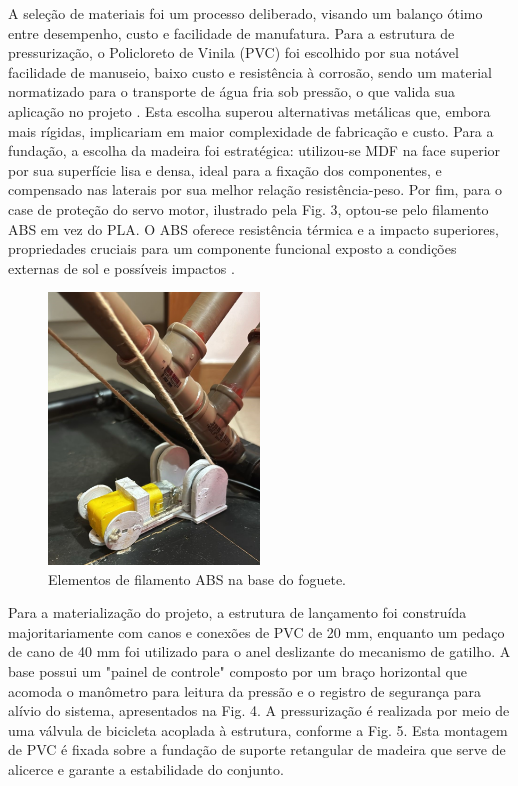 A seleção de materiais foi um processo deliberado, visando um balanço ótimo entre desempenho, custo e facilidade de manufatura. Para a estrutura de pressurização, o Policloreto de Vinila (PVC) foi escolhido por sua notável facilidade de manuseio, baixo custo e resistência à corrosão, sendo um material normatizado para o transporte de água fria sob pressão, o que valida sua aplicação no projeto \cite{tigre_soldavel}. Esta escolha superou alternativas metálicas que, embora mais rígidas, implicariam em maior complexidade de fabricação e custo. Para a fundação, a escolha da madeira foi estratégica: utilizou-se MDF na face superior por sua superfície lisa e densa, ideal para a fixação dos componentes, e compensado nas laterais por sua melhor relação resistência-peso. Por fim, para o case de proteção do servo motor, ilustrado pela Fig. 3, optou-se pelo filamento ABS em vez do PLA. O ABS oferece resistência térmica e a impacto superiores, propriedades cruciais para um componente funcional exposto a condições externas de sol e possíveis impactos \cite{ozsoy2021}.

\begin{figure}[H]
	\centering
	\includegraphics[width=0.5\textwidth,height=\textheight,keepaspectratio]{figuras/estruturas/base_foguete_perto.png}
	\caption{Elementos de filamento ABS na base do foguete.}
	\label{fig_base_foguete_lancamento}
\end{figure}

Para a materialização do projeto, a estrutura de lançamento foi construída majoritariamente com canos e conexões de PVC de 20 mm, enquanto um pedaço de cano de 40 mm foi utilizado para o anel deslizante do mecanismo de gatilho. A base possui um "painel de controle" composto por um braço horizontal que acomoda o manômetro para leitura da pressão e o registro de segurança para alívio do sistema, apresentados na Fig. 4. A pressurização é realizada por meio de uma válvula de bicicleta acoplada à estrutura, conforme a Fig. 5. Esta montagem de PVC é fixada sobre a fundação de suporte retangular de madeira que serve de alicerce e garante a estabilidade do conjunto. 

